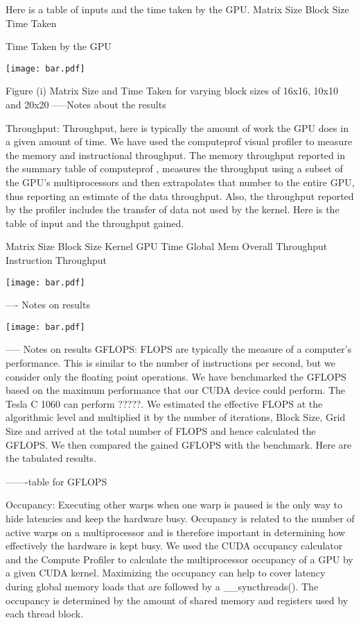 \documentclass[11pt, twocolumn]{article}
\begin{document}
    Here is a table of  inputs and the time taken by the GPU.
    Matrix Size Block Size  Time Taken


    Time Taken by the GPU

    \begin{center}
    \texttt{[image: bar.pdf]}
    \end{center}
    Figure (i) Matrix Size and Time Taken for varying block sizes of 16x16, 10x10 and 20x20
    -----Notes about the results

    Throughput:  Throughput, here is typically the amount of work the GPU does in a given amount of time. We have used the computeprof visual profiler to measure the memory and instructional throughput. The memory throughput reported in the summary table of computeprof ,  measures  the throughput using a subset of the GPU’s multiprocessors and then extrapolates that number to the entire GPU, thus reporting an estimate of the data throughput. Also, the throughput reported by the profiler includes the transfer of data not used by the kernel.  Here is the table of input and the throughput gained.




    Matrix Size Block Size     Kernel   GPU Time    Global Mem Overall Throughput   Instruction Throughput

    \begin{center}
    \texttt{[image: bar.pdf]}
    \end{center}

    ---- Notes on results

    \begin{center}
    \texttt{[image: bar.pdf]}
    \end{center}

    ----- Notes on results
    GFLOPS:   FLOPS are typically the measure of a computer’s performance.
    This is similar to the number of instructions per second, but we consider only the floating point operations.
    We have benchmarked the GFLOPS based on the maximum performance that our CUDA device could perform.
    The Tesla C 1060 can perform ?????.
    We estimated the effective FLOPS at the algorithmic level and multiplied it by the number of iterations, Block Size, Grid Size and arrived at the total number of FLOPS and hence calculated the GFLOPS.
    We then compared the gained GFLOPS with the benchmark.
    Here are the tabulated results.

    -------table for GFLOPS

    Occupancy:  Executing other warps when one warp is paused is the only way to hide latencies and keep the hardware busy.
    Occupancy is related to the number of active warps on a multiprocessor and is therefore important in determining how effectively the hardware is kept busy.
    We used the CUDA occupancy calculator and the Compute Profiler  to calculate the multiprocessor occupancy of a GPU by a given CUDA kernel.
    Maximizing the occupancy can help to cover latency during global memory loads that are followed by a \_\_syncthreads().
    The occupancy is determined by the amount of shared memory and registers used by each thread block.
\end{document}
